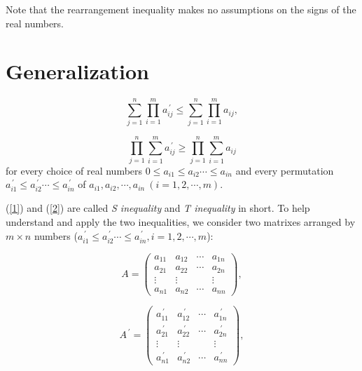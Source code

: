 \documentclass[a4paper]{report}
\begin{document}
Note that the rearrangement inequality makes no assumptions on the signs of the real numbers.
\par\;\par\;

\section{Generalization}
\begin{thr}

\begin{equation}
\sum \limits^{n}_{j=1}\prod \limits^{m}_{i=1}a^{\,\prime}_{ij}\leqslant
\sum \limits^{n}_{j=1}\prod \limits^{m}_{i=1}a_{ij},\label{1}
\end{equation}

\begin{equation}
\prod \limits^{n}_{j=1}\sum \limits^{m}_{i=1}a^{\,\prime}_{ij}\geqslant
\prod \limits^{n}_{j=1}\sum \limits^{m}_{i=1}a_{ij}\label{2}
\end{equation}
for every choice of real numbers
	$0\leqslant a_{i1}\leqslant a_{i2} \cdots\leqslant a_{in} $
	and every permutation
	$a^{\,\prime}_{i1}\leqslant a^{\,\prime}_{i2} \cdots\leqslant a^{\,\prime}_{in} $
	of	$a_{i1},a_{i2},\cdots,a_{in}\ (i=1,2,\cdots,m).$
\end{thr}
(\ref{1}) and (\ref{2}) are called \emph{S inequality} and \emph{T inequality} in short.
To help understand and apply the two inequalities, we consider two 
matrixes arranged by $m\times n$ numbers ($a^{\,\prime}_{i1}\leqslant a^{\,\prime}_{i2} \cdots\leqslant a^{\,\prime}_{in} ,
	 i=1,2,\cdots,m$):

\[A=
\left(\begin{array}{cccc}
a_{11}& a_{12}& \cdots & a_{1n} \\
a_{21}& a_{22}& \cdots & a_{2n} \\
\vdots& \vdots & & \vdots \\
a_{n1}& a_{n2}& \cdots & a_{nn}
\end{array}\right),
\]

\[A^{\,\prime}=
\left(\begin{array}{cccc}
a^{\,\prime}_{11}& a^{\,\prime}_{12}& \cdots & a^{\,\prime}_{1n} \\
a^{\,\prime}_{21}& a^{\,\prime}_{22}& \cdots & a^{\,\prime}_{2n} \\
\vdots& \vdots & & \vdots \\
a^{\,\prime}_{n1}& a^{\,\prime}_{n2}& \cdots & a^{\,\prime}_{nn}
\end{array}\right),
\]
\end{document}
